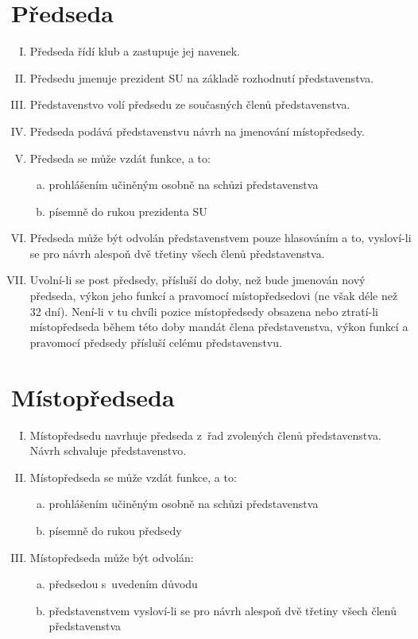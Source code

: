 \documentclass[10pt]{article}
\begin{document}
\section{Předseda} %
	\begin{enumerate}[I.]
	\item Předseda řídí klub a zastupuje jej navenek.  
	\item Předsedu jmenuje prezident SU na základě rozhodnutí představenstva.
	\item Představenstvo volí předsedu ze současných členů představenstva.
	\item Předseda podává představenstvu návrh na jmenování místopředsedy.
	\item Předseda se může vzdát funkce, a to:  
		\begin{enumerate}[a.]
		\item prohlášením učiněným osobně na schůzi představenstva
		\item písemně do rukou prezidenta SU  
		\end{enumerate}
	\item Předseda může být odvolán představenstvem pouze hlasováním a to, vysloví-li se pro návrh alespoň dvě třetiny všech členů představenstva. 
	\item Uvolní-li se post předsedy, přísluší do doby, než bude jmenován nový předseda, výkon jeho funkcí a pravomocí místopředsedovi (ne však déle než 32 dní). Není-li v tu chvíli pozice místopředsedy obsazena nebo ztratí-li místopředseda během této doby mandát člena představenstva, výkon funkcí a pravomocí předsedy přísluší celému představenstvu.
	\end{enumerate}

\section{Místopředseda}
	\begin{enumerate}[I.]
	\item Místopředsedu navrhuje předseda z~řad zvolených členů představenstva. Návrh schvaluje představenstvo.  
	\item Místopředseda se může vzdát funkce, a to:  
		\begin{enumerate}[a.]
		\item prohlášením učiněným osobně na schůzi představenstva
		\item písemně do rukou předsedy  
		\end{enumerate}
	\item Místopředseda může být odvolán:  
		\begin{enumerate}[a.]
		\item předsedou s~uvedením důvodu
		\item představenstvem vysloví-li se pro návrh alespoň dvě třetiny všech členů představenstva
		\end{enumerate}
	\end{enumerate}
\end{document}
